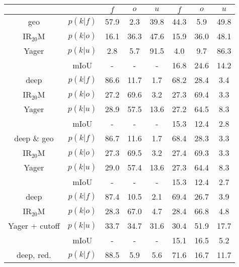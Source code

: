 \begin{center}
	\begin{tabular}{c|c|ccc|ccc}
		& \backslashbox{}{\scriptsize{$k$}} & $f$ & $o$ & $u$ & $f$ & $o$ & $u$\\
		\hline
		geo&$p(k|f)$ & \textcolor{mygreen}{57.9} & \textcolor{myred}{2.3} & 39.8& \textcolor{mygreen}{44.3} & \textcolor{myred}{5.9} & 49.8 \\
		IR$_{20}$M&$p(k|o)$ & \textcolor{myred}{16.1} & \textcolor{mygreen}{36.3} & 47.6& \textcolor{myred}{15.9} & \textcolor{mygreen}{36.0} & 48.1 \\
		Yager&$p(k|u)$ & 2.8 & 5.7 & 91.5& 4.0 & 9.7 & 86.3 \\
		& mIoU & - & - & - &16.8&24.6&14.2 \\
		\hline	
		deep&$p(k|f)$ & \textcolor{mygreen}{86.6} & \textcolor{myred}{11.7} & 1.7& \textcolor{mygreen}{68.2} & \textcolor{myred}{28.4} & 3.4 \\
		IR$_{20}$M&$p(k|o)$ & \textcolor{myred}{27.2} & \textcolor{mygreen}{69.6} & 3.2& \textcolor{myred}{27.3} & \textcolor{mygreen}{69.4} & 3.3 \\
		Yager&$p(k|u)$ & 28.9 & 57.5 & 13.6& 27.2 & 64.5 & 8.3 \\
		& mIoU & - & - & - &15.3&12.4&2.8 \\
		\hline
		deep \& geo&$p(k|f)$ & \textcolor{mygreen}{86.7} & \textcolor{myred}{11.6} & 1.7& \textcolor{mygreen}{68.4} & \textcolor{myred}{28.3} & 3.3 \\
		IR$_{20}$M&$p(k|o)$ & \textcolor{myred}{27.3} & \textcolor{mygreen}{69.5} & 3.2& \textcolor{myred}{27.4} & \textcolor{mygreen}{69.3} & 3.3 \\
		Yager&$p(k|u)$ & 29.0 & 57.4 & 13.6& 27.3 & 64.4 & 8.3 \\
		& mIoU & - & - & - &15.3&12.4&2.7 \\
		\hline
		deep&$p(k|f)$ & \textcolor{mygreen}{87.4} & \textcolor{myred}{10.5} & 2.1& \textcolor{mygreen}{69.4} & \textcolor{myred}{26.7} & 3.9 \\
		IR$_{20}$M&$p(k|o)$ & \textcolor{myred}{28.3} & \textcolor{mygreen}{67.0} & 4.7& \textcolor{myred}{28.4} & \textcolor{mygreen}{66.8} & 4.8 \\
		Yager + cutoff&$p(k|u)$ & 33.7 & 34.7 & 31.6& 30.4 & 51.9 & 17.7 \\
		& mIoU & - & - & - &15.1&16.5&5.2 \\			
		\hline
		deep, red.&$p(k|f)$ & \textcolor{mygreen}{88.5} & \textcolor{myred}{5.9} & 5.6& \textcolor{mygreen}{71.6} & \textcolor{myred}{16.7} & 11.7 \\

\end{tabular}
\end{center}
